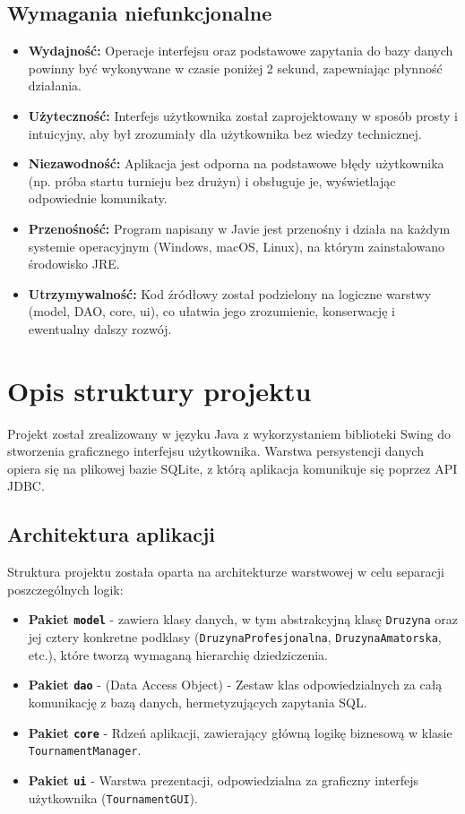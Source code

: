 \documentclass[12pt, a4paper]{article}
\begin{document}
\subsection{Wymagania niefunkcjonalne}
\begin{itemize}
    \item \textbf{Wydajność:} Operacje interfejsu oraz podstawowe zapytania do bazy danych powinny być wykonywane w czasie poniżej 2 sekund, zapewniając płynność działania.
    \item \textbf{Użyteczność:} Interfejs użytkownika został zaprojektowany w sposób prosty i intuicyjny, aby był zrozumiały dla użytkownika bez wiedzy technicznej.
    \item \textbf{Niezawodność:} Aplikacja jest odporna na podstawowe błędy użytkownika (np. próba startu turnieju bez drużyn) i obsługuje je, wyświetlając odpowiednie komunikaty.
    \item \textbf{Przenośność:} Program napisany w Javie jest przenośny i działa na każdym systemie operacyjnym (Windows, macOS, Linux), na którym zainstalowano środowisko JRE.
    \item \textbf{Utrzymywalność:} Kod źródłowy został podzielony na logiczne warstwy (model, DAO, core, ui), co ułatwia jego zrozumienie, konserwację i ewentualny dalszy rozwój.
\end{itemize}

\section{Opis struktury projektu}
Projekt został zrealizowany w języku Java z wykorzystaniem biblioteki Swing do stworzenia graficznego interfejsu użytkownika. Warstwa persystencji danych opiera się na plikowej bazie SQLite, z którą aplikacja komunikuje się poprzez API JDBC.

\subsection{Architektura aplikacji}
Struktura projektu została oparta na architekturze warstwowej w celu separacji poszczególnych logik:
\begin{itemize}
    \item \textbf{Pakiet \texttt{model}} - zawiera klasy danych, w tym abstrakcyjną klasę \texttt{Druzyna} oraz jej cztery konkretne podklasy (\texttt{DruzynaProfesjonalna}, \texttt{DruzynaAmatorska}, etc.), które tworzą wymaganą hierarchię dziedziczenia.
    \item \textbf{Pakiet \texttt{dao}} - (Data Access Object) - Zestaw klas odpowiedzialnych za całą komunikację z bazą danych, hermetyzujących zapytania SQL.
    \item \textbf{Pakiet \texttt{core}} - Rdzeń aplikacji, zawierający główną logikę biznesową w klasie \texttt{TournamentManager}.
    \item \textbf{Pakiet \texttt{ui}} - Warstwa prezentacji, odpowiedzialna za graficzny interfejs użytkownika (\texttt{TournamentGUI}).
\end{itemize}
\end{document}
